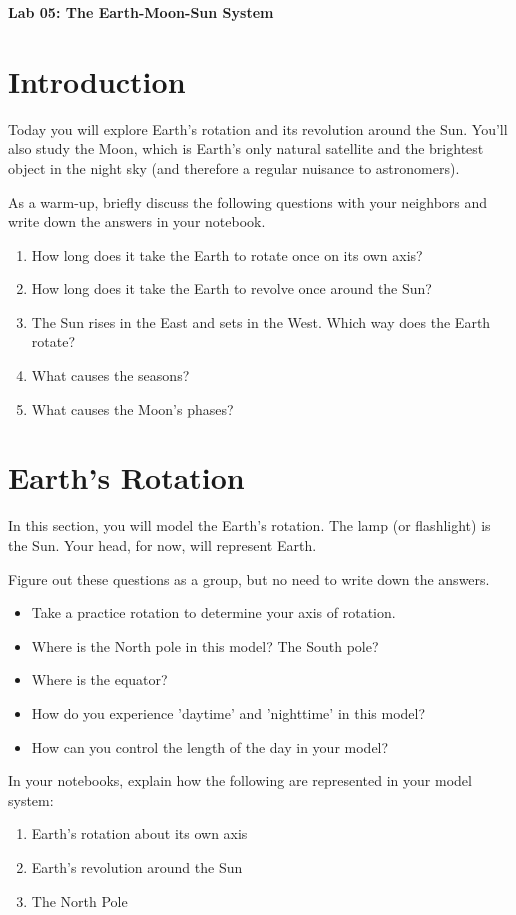 \documentclass[11pt]{article}%
\newcommand{\labnumber}{05}  %
\begin{document}
\begin{center}
\Large\textbf{Lab \labnumber: The Earth-Moon-Sun System}
\end{center}

\section{Introduction}

Today you will explore Earth's rotation and its revolution around the Sun. You'll also study the Moon, which is Earth's only natural satellite and the brightest object in the night sky (and therefore a regular nuisance to astronomers).

As a warm-up, briefly discuss the following questions with your neighbors and write
down the answers in your notebook.
\begin{enumerate}
\item How long does it take the Earth to rotate once on its own axis?
\item How long does it take the Earth to revolve once around the Sun?
\item The Sun rises in the East and sets in the West. Which way does the Earth rotate?
\item What causes the seasons?
\item What causes the Moon's phases?
\end{enumerate}


\section{Earth's Rotation}
In this section, you will model the Earth's rotation.  The lamp (or flashlight) is the Sun. Your head, for now, will represent Earth.

Figure out these questions as a group, but no need to write down the answers.
\begin{itemize}
	\item Take a practice rotation to determine your axis of rotation.
	\item Where is the North pole in this model? The South pole?
	\item Where is the equator?
	\item How do you experience 'daytime' and 'nighttime' in this model?
	\item How can you control the length of the day in your model?
\end{itemize}

In your notebooks, explain how the following are represented in your model system:
\begin{enumerate}
	\item Earth's rotation about its own axis
	\item Earth's revolution around the Sun
	\item The North Pole
\end{enumerate}
\end{document}
